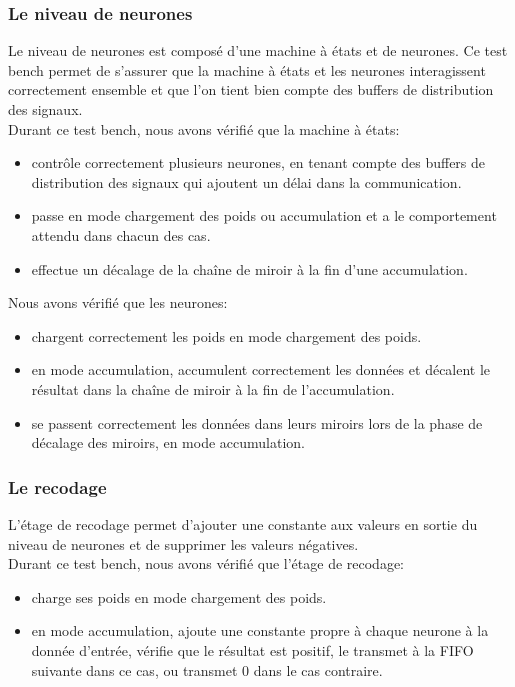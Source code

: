 \subsubsection{Le niveau de neurones}

Le niveau de neurones est composé d'une machine à états et de neurones.
Ce test bench permet de s'assurer que la machine à états et les neurones
interagissent correctement ensemble et que l'on tient bien compte des buffers
de distribution des signaux.\\

Durant ce test bench, nous avons vérifié que la machine à états:
\begin{itemize}
	\item contrôle correctement plusieurs neurones, en tenant
	compte des buffers de distribution des signaux qui ajoutent un
	délai dans la communication.
	\item passe en mode chargement des poids ou accumulation et a le
	comportement attendu dans chacun des cas.
	\item effectue un décalage de la chaîne de miroir à la fin d'une
	accumulation.
\end{itemize}

Nous avons vérifié que les neurones:
\begin{itemize}
	\item chargent correctement les poids en mode chargement des poids.
	\item en mode accumulation, accumulent correctement les données et
	décalent le résultat dans la chaîne de miroir à la fin de
	l'accumulation.
	\item se passent correctement les données dans leurs miroirs lors
	de la phase de décalage des miroirs, en mode accumulation.
\end{itemize}

\subsubsection{Le recodage}

L'étage de recodage permet d'ajouter une constante aux valeurs en sortie du
niveau de neurones et de supprimer les valeurs négatives.\\

Durant ce test bench, nous avons vérifié que l'étage de recodage:
\begin{itemize}
	\item charge ses poids en mode chargement des poids.
	\item en mode accumulation, ajoute une constante propre à chaque neurone
	à la donnée d'entrée, vérifie que le résultat est positif, le transmet à
	la FIFO suivante dans ce cas, ou transmet 0 dans le cas contraire.
\end{itemize}

